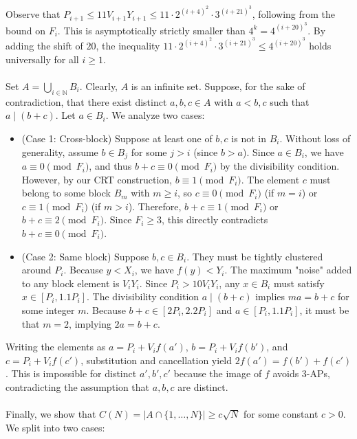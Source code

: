 \\\\
Observe that $P_{i+1} \leq 11V_{i + 1}Y_{i + 1} \leq 11 \cdot 2^{(i + 4)^2} \cdot 3^{(i + 21)^3}$, following from the bound on $F_i$. This is asymptotically strictly smaller than $4^k = 4^{(i+20)^3}$. By adding the shift of $20$, the inequality $11 \cdot 2^{(i + 4)^2} \cdot 3^{(i + 21)^3} \le 4^{(i+20)^3}$ holds universally for all $i \ge 1$.
\\\\
Set $A = \bigcup_{i \in \mathbb{N}} B_i$. Clearly, $A$ is an infinite set. Suppose, for the sake of contradiction, that there exist distinct $a,b,c \in A$ with $a < b,c$ such that $a \mid (b + c)$. Let $a \in B_i$. We analyze two cases:
\begin{itemize}
    \item (Case 1: Cross-block) Suppose at least one of $b,c$ is not in $B_i$. Without loss of generality, assume $b \in B_j$ for some $j > i$ (since $b > a$). Since $a \in B_i$, we have $a \equiv 0 \pmod{F_i}$, and thus $b + c \equiv 0 \pmod{F_i}$ by the divisibility condition. However, by our CRT construction, $b \equiv 1 \pmod{F_i}$. The element $c$ must belong to some block $B_m$ with $m \ge i$, so $c \equiv 0 \pmod{F_i}$ (if $m=i$) or $c \equiv 1 \pmod{F_i}$ (if $m > i$). Therefore, $b + c \equiv 1 \pmod{F_i}$ or $b + c \equiv 2 \pmod{F_i}$. Since $F_i \ge 3$, this directly contradicts $b + c \equiv 0 \pmod{F_i}$.
    \item (Case 2: Same block) Suppose $b, c \in B_i$. They must be tightly clustered around $P_i$. Because $y < X_i$, we have $f(y) < Y_i$. The maximum "noise" added to any block element is $V_iY_i$. Since $P_i > 10V_iY_i$, any $x \in B_i$ must satisfy $x \in [P_i, 1.1P_i]$. The divisibility condition $a \mid (b+c)$ implies $m a = b + c$ for some integer $m$. Because $b+c \in [2P_i, 2.2P_i]$ and $a \in [P_i, 1.1P_i]$, it must be that $m = 2$, implying $2a = b + c$. 
\end{itemize}
Writing the elements as $a = P_i + V_if(a')$, $b = P_i + V_if(b')$, and $c = P_i + V_if(c')$, substitution and cancellation yield $2f(a') = f(b') + f(c')$. This is impossible for distinct $a', b', c'$ because the image of $f$ avoids 3-APs, contradicting the assumption that $a,b,c$ are distinct.
\\\\
Finally, we show that $C(N) = |A \cap \{1, \dots, N\}| \ge c\sqrt{N}$ for some constant $c > 0$. We split into two cases:
